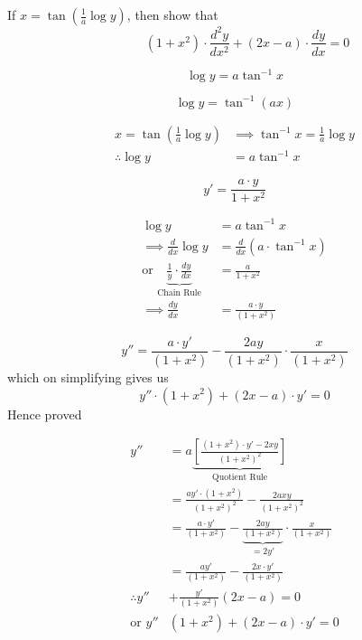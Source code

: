 \documentclass[14pt,fleqn]{extarticle}
\begin{document}
\newcommand\dnm{\left(1+x^2 \right)}
If $x = \tan\left( \frac{1}{a}\log y \right)$, then show that
\[ \qquad (1+x^2)\cdot\frac{d^2 y}{dx^2} + (2x-a)\cdot\frac{dy}{dx} = 0\]
%

\newcard

\[ \log y = a\tan^{-1} x \]

\newcard 

\[ \log y = \tan^{-1} \left(ax \right)\]

\newcard 

\begin{align}
	x = \tan \left( \frac{1}{a}\log y \right) &\implies \tan^{-1} x = \frac{1}{a}\log y \\
	\therefore \log y &= a\tan^{-1} x 
\end{align}

\newcard 

\[ y' = \frac{a\cdot y}{1+x^2}\]

\newcard 

\begin{align}
	\log y &= a\tan^{-1} x \\
	\implies \frac{d}{dx}\log y &= \frac{d}{dx} \left(a\cdot\tan^{-1} x \right) \\
	\text{or } \underbrace{\frac{1}{y}\cdot \frac{dy}{dx}}_{\text{Chain Rule}} &= \frac{a}{1+x^2} \\
	\implies \frac{dy}{dx} &= \frac{a\cdot y}{\dnm}
\end{align}


\newcard 

\[ y'' = \frac{a\cdot y'}{\dnm} - \frac{2ay}{\dnm}\cdot \frac{x}{\dnm}\]
which on simplifying gives us 
\[ y''\cdot\dnm + (2x-a)\cdot y' = 0 \]
Hence proved 
\newcard 


\begin{align}
	y'' &= a \underbrace{\left[\frac{\left(1+x^2 \right)\cdot y ' - 2xy}{\left(1+x^2 \right)^2} \right]}_{\text{Quotient Rule}} \\
	&= \frac{ay'\cdot \dnm}{\dnm^2} - \frac{2axy}{\dnm^2} \\
	&= \frac{a\cdot y'}{\dnm} - \underbrace{\frac{2ay}{\dnm}}_{ = 2 y'}\cdot \frac{x}{\dnm} \\
	&= \frac{ay'}{\dnm} - \frac{2x\cdot y'}{\dnm} \\
	\therefore y'' &+ \frac{y'}{\dnm}\left(2x-a \right) = 0 \\ 
	\text{or } y''&\dnm  + (2x-a)\cdot y' = 0
\end{align}
\end{document}
